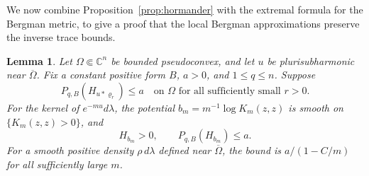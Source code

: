 \documentclass[reqno]{amsart}
\numberwithin{equation}{section}
\newtheorem{lemma}[theorem]{Lemma}
\theoremstyle{definition}
\begin{document}
We now combine Proposition~\ref{prop:hormander}
with the extremal formula for the Bergman metric, to give a proof that the local Bergman approximations preserve the inverse trace bounds. 
\begin{lemma}\label{lem:bergman-trace}
Let $\Omega\Subset\mathbb C^n$ be bounded pseudoconvex, and let $u$ be plurisubharmonic near $\overline\Omega$. Fix a constant positive form $B$, $a>0$, and $1\le q\le n$. Suppose
\begin{equation}\label{eq:bergman-full}
 P_{q,B}(H_{u*\varrho_r})\le a
 \quad\text{on }\Omega\text{ for all sufficiently small }r>0.
\end{equation}
For the kernel of $e^{-mu}d\lambda$, the potential $b_m=m^{-1}\log K_m(z,z)$ is smooth on $\{K_m(z,z)>0\}$, and
\begin{equation}\label{eq:bergman-partial}
 H_{b_m}>0,\qquad P_{q,B}(H_{b_m})\le a.
\end{equation}
For a smooth positive density $\rho\,d\lambda$ defined near $\overline\Omega$, the bound is $a/(1-C/m)$ for all sufficiently large $m$.
\end{lemma}
\end{document}
